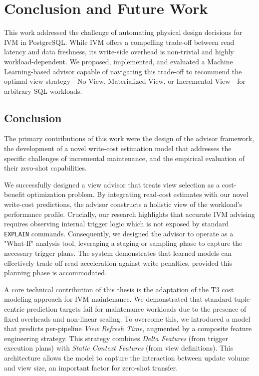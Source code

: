 \chapter{Conclusion and Future Work}
\label{chap:conclusion_futurework}

This work addressed the challenge of automating physical design decisions for \ac{IVM} in PostgreSQL. While \ac{IVM} offers a compelling trade-off between read latency and data freshness, its write-side overhead is non-trivial and highly workload-dependent. We proposed, implemented, and evaluated a Machine Learning-based advisor capable of navigating this trade-off to recommend the optimal view strategy---No View, Materialized View, or Incremental View---for arbitrary SQL workloads.

\section{Conclusion}
\label{sec:conclusion}

The primary contributions of this work were the design of the advisor framework, the development of a novel write-cost estimation model that addresses the specific challenges of incremental maintenance, and the empirical evaluation of their zero-shot capabilities.

We successfully designed a view advisor that treats view selection as a cost-benefit optimization problem. By integrating read-cost estimates with our novel write-cost predictions, the advisor constructs a holistic view of the workload's performance profile. Crucially, our research highlights that accurate IVM advising requires observing internal trigger logic which is not exposed by standard \texttt{EXPLAIN} commands. Consequently, we designed the advisor to operate as a "What-If" analysis tool, leveraging a staging or sampling phase to capture the necessary trigger plans. The system demonstrates that learned models can effectively trade off read acceleration against write penalties, provided this planning phase is accommodated.

A core technical contribution of this thesis is the adaptation of the \ac{T3} cost modeling approach for \ac{IVM} maintenance. We demonstrated that standard tuple-centric prediction targets fail for maintenance workloads due to the presence of fixed overheads and non-linear scaling. To overcome this, we introduced a model that predicts per-pipeline \textit{View Refresh Time}, augmented by a composite feature engineering strategy. This strategy combines \textit{Delta Features} (from trigger execution plans) with \textit{Static Context Features} (from view definitions). This architecture allows the model to capture the interaction between update volume and view size, an important factor for zero-shot transfer.

